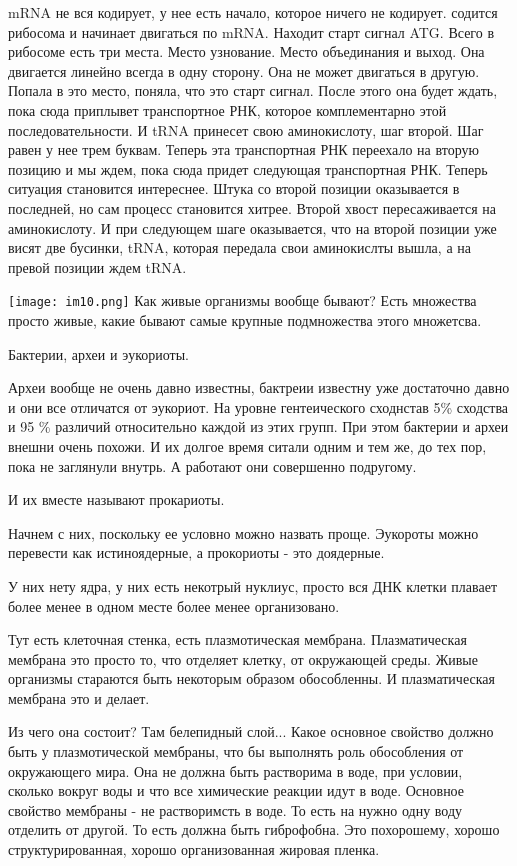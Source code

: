 mRNA не вся кодирует, у нее есть начало, которое ничего не кодирует. содится рибосома и
начинает двигаться по mRNA. Находит старт сигнал ATG. Всего в рибосоме есть три места.
Место узнование. Место объединания и выход. Она двигается линейно всегда в одну сторону.
Она не может двигаться в другую. Попала в это место, поняла, что 
это старт сигнал. После этого она будет ждать, пока 
сюда приплывет транспортное РНК, которое комплементарно этой последовательности. 
И tRNA принесет свою аминокислоту, шаг второй. Шаг равен у нее трем буквам. Теперь эта 
транспортная РНК переехало на вторую позицию и мы ждем, пока сюда придет следующая 
транспортная РНК. Теперь ситуация становится интереснее. Штука со второй позиции оказывается 
в последней, но сам процесс становится хитрее. Второй хвост пересаживается на аминокислоту. 
И при следующем шаге оказывается, что на второй позиции уже висят две бусинки, tRNA, которая 
передала свои аминокислты вышла, а на превой позиции ждем tRNA.

 
\texttt{[image: im10.png]}
Как живые организмы вообще бывают? 
Есть множества просто живые, какие бывают самые крупные подмножества 
этого множетсва. 

Бактерии, археи и эукориоты. 

Археи вообще не очень давно известны, бактреии известну уже 
достаточно давно и они все отличатся от эукориот. На уровне 
гентеического сходнстав 5\% сходства и 95 \% различий относительно каждой из этих 
групп. При этом бактерии и археи внешни очень похожи. И их 
долгое время ситали одним и тем же, до тех пор, 
пока не заглянули внутрь. А работают они совершенно подругому. 

И их вместе называют прокариоты. 

Начнем с них, поскольку ее условно можно назвать проще. Эукороты 
можно перевести как истиноядерные, а прокориоты - это доядерные. 

У них нету ядра, у них есть некотрый нуклиус, просто вся ДНК
клетки плавает более менее в одном месте более менее организовано.

Тут есть клеточная стенка, есть плазмотическая мембрана. Плазматическая мембрана
это просто то, что отделяет клетку, от окружающей среды. Живые организмы стараются
быть некоторым образом обособленны. И плазматическая мембрана это и делает.
                                                      
Из чего она состоит? Там белепидный слой... Какое основное
свойство должно быть у плазмотической мембраны, что бы выполнять роль обособления
от окружающего мира. Она не должна быть растворима в воде,
при условии, сколько вокруг воды и что все химические реакции идут в воде. Основное
свойство мембраны - не растворимсть в воде. То есть на нужно одну воду отделить от другой.
То есть должна быть гиброфобна. Это похорошему, хорошо структурированная, хорошо 
организованная жировая пленка. 


